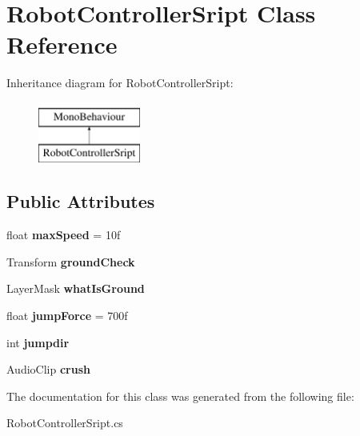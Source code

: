 \hypertarget{class_robot_controller_sript}{}\section{Robot\+Controller\+Sript Class Reference}
\label{class_robot_controller_sript}
Inheritance diagram for Robot\+Controller\+Sript\+:\begin{figure}[H]
\begin{center}
\leavevmode
\includegraphics[height=2.000000cm]{class_robot_controller_sript}
\end{center}
\end{figure}
\subsection*{Public Attributes}
\begin{DoxyCompactItemize}
\item 
\hypertarget{class_robot_controller_sript_afc3d6129088b04b7201251e36cc395f8}{}float {\bfseries max\+Speed} = 10f\label{class_robot_controller_sript_afc3d6129088b04b7201251e36cc395f8}

\item 
\hypertarget{class_robot_controller_sript_a94b64fa5463dff9f47e8b343c51664cf}{}Transform {\bfseries ground\+Check}\label{class_robot_controller_sript_a94b64fa5463dff9f47e8b343c51664cf}

\item 
\hypertarget{class_robot_controller_sript_a532838fbb2f95bf6f8f4c177058d00c5}{}Layer\+Mask {\bfseries what\+Is\+Ground}\label{class_robot_controller_sript_a532838fbb2f95bf6f8f4c177058d00c5}

\item 
\hypertarget{class_robot_controller_sript_a44f7b8532b8e9259f7e1d3243e650914}{}float {\bfseries jump\+Force} = 700f\label{class_robot_controller_sript_a44f7b8532b8e9259f7e1d3243e650914}

\item 
\hypertarget{class_robot_controller_sript_ab00409bc1b9b249cebcd04228c12eaeb}{}int {\bfseries jumpdir}\label{class_robot_controller_sript_ab00409bc1b9b249cebcd04228c12eaeb}

\item 
\hypertarget{class_robot_controller_sript_ae98a4119e477ff872c360ca4a1436dc3}{}Audio\+Clip {\bfseries crush}\label{class_robot_controller_sript_ae98a4119e477ff872c360ca4a1436dc3}

\end{DoxyCompactItemize}


The documentation for this class was generated from the following file\+:\begin{DoxyCompactItemize}
\item 
Robot\+Controller\+Sript.\+cs\end{DoxyCompactItemize}
